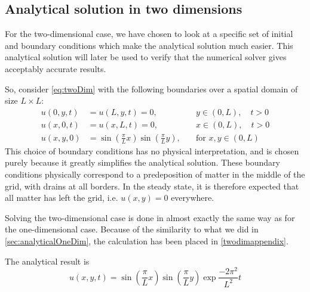 \subsection{Analytical solution in two dimensions}
For the two-dimensional case, we have chosen to look at a specific set of initial and boundary conditions which make the analytical solution much easier. This analytical solution will later be used to verify that the numerical solver gives acceptably accurate results.

So, consider \vref{eq:twoDim} with the following boundaries over a spatial domain of size \(L \times L\):
\begin{equation} \label{eq:twoDimBoundaries}
\begin{aligned}
u(0,y,t) &= u(L,y,t) = 0, \quad &y \in (0,L),\quad t > 0 \\
u(x,0,t) &= u(x,L,t) = 0, \quad &x \in (0,L),\quad t > 0 \\
u(x,y,0) &= \sin(\frac{\pi}{L}x)\sin(\frac{\pi}{L}y), \quad&\text{for }x,y\in (0,L)
\end{aligned}
\end{equation}
This choice of boundary conditions has no physical interpretation, and is chosen purely because it greatly simplifies the analytical solution. These boundary conditions physically correspond to a predeposition of matter in the middle of the grid, with drains at all borders. In the steady state, it is therefore expected that all matter has left the grid, i.e. \(u(x,y)=0\) everywhere.

Solving the two-dimensional case is done in almost exactly the same way as for the one-dimensional case. Because of the similarity to what we did in \vref{sec:analyticalOneDim}, the calculation has been placed in \ref{twodimappendix}.

The analytical result is
\begin{equation} \label{eq:analyticalSolutionTwoDim}
u(x,y,t) = \sin(\frac{\pi}{L}x)\sin(\frac{\pi}{L}y)\exp{\frac{-2\pi^2}{L^2}t}
\end{equation}
